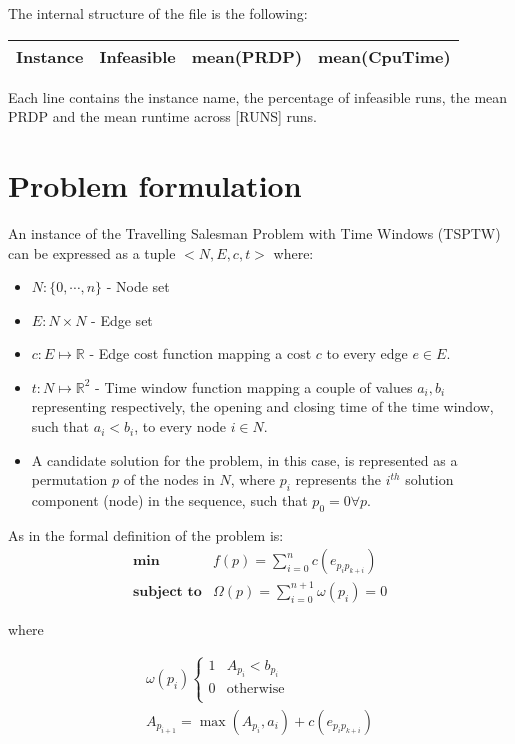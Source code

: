 \documentclass{article}
\begin{document}
The internal structure of the file is the following:
 
\begin{tabular}{|c|c|c|c|}
\hline
\textbf{Instance}	&	\textbf{Infeasible} & \textbf{mean(PRDP)} &	\textbf{mean(CpuTime)} \\ \hline
\end{tabular}

Each line contains the instance name, the percentage of infeasible runs, the mean PRDP and the mean runtime across [RUNS] runs.

\section{Problem formulation}
An instance of the Travelling Salesman Problem with Time Windows (TSPTW) can be expressed as a tuple $<N,E,c,t>$ where:
\begin{itemize}
  \item $N:\{0,\cdots,n\}$ - Node set 
  \item $E:N\times N$ - Edge set
  \item $c:E\mapsto \mathbb{R}$ - Edge cost function mapping a cost $c$ to every edge $e \in E$. 
  \item $t:N\mapsto \mathbb{R}^2$ - Time window function mapping a couple of values $a_i,b_i$ representing respectively, the opening and closing time of the time window, such that $a_i<b_i$, to every node $i \in N$.
  \item A candidate solution for the problem, in this case, is represented as a permutation $p$ of the nodes in $N$, where $p_i$ represents the $i^{th}$ solution component (node) in the sequence, such that $p_0 = 0 \forall p$.
\end{itemize}

As in \cite{lopez2010beam} the formal definition of the problem is:
\begin{equation} \label{eq:probform}
 \begin{array}{rl}
  \textbf{min} & f(p)= \sum\limits_{i=0}^{n} c(e_{p_{i}p_{k+i}}) \\
  \textbf{subject to} & \Omega(p)= \sum\limits_{i=0}^{n+1} \omega(p_{i}) = 0
 \end{array}
\end{equation}

where

\begin{equation} \label{eq:cv}
\begin{array}{c}
 \omega(p_{i}) \begin{cases}
                1 & A_{p_i} < b_{p_i}  \\
                0 & \text{otherwise} \\   
               \end{cases} \\
 A_{p_{i+1}} = \max(A_{p_i},a_i) + c(e_{p_{i}p_{k+i}}) 
\end{array}
\end{equation}
\end{document}

